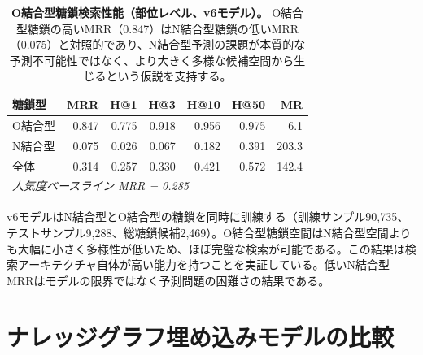 \documentclass[11pt,a4paper]{ltjsarticle}
\begin{document}
\begin{table}[H]
\centering
\caption{\textbf{O結合型糖鎖検索性能（部位レベル、v6モデル）。}
O結合型糖鎖の高いMRR（0.847）はN結合型糖鎖の低いMRR（0.075）と対照的であり、N結合型予測の課題が本質的な予測不可能性ではなく、より大きく多様な候補空間から生じるという仮説を支持する。}
\label{tab:olinked}
\small
\begin{tabular}{lrrrrrr}
\toprule
\textbf{糖鎖型} & \textbf{MRR} & \textbf{H@1} & \textbf{H@3} & \textbf{H@10} & \textbf{H@50} & \textbf{MR} \\
\midrule
O結合型   & 0.847 & 0.775 & 0.918 & 0.956 & 0.975 & 6.1 \\
N結合型   & 0.075 & 0.026 & 0.067 & 0.182 & 0.391 & 203.3 \\
全体    & 0.314 & 0.257 & 0.330 & 0.421 & 0.572 & 142.4 \\
\midrule
\multicolumn{7}{l}{\textit{人気度ベースライン MRR = 0.285}} \\
\bottomrule
\end{tabular}
\end{table}

v6モデルはN結合型とO結合型の糖鎖を同時に訓練する（訓練サンプル90,735、テストサンプル9,288、総糖鎖候補2,469）。O結合型糖鎖空間はN結合型空間よりも大幅に小さく多様性が低いため、ほぼ完璧な検索が可能である。この結果は検索アーキテクチャ自体が高い能力を持つことを実証している。低いN結合型MRRはモデルの限界ではなく予測問題の困難さの結果である。

\section{ナレッジグラフ埋め込みモデルの比較}
\label{sec:kg_embedding}
\end{document}
